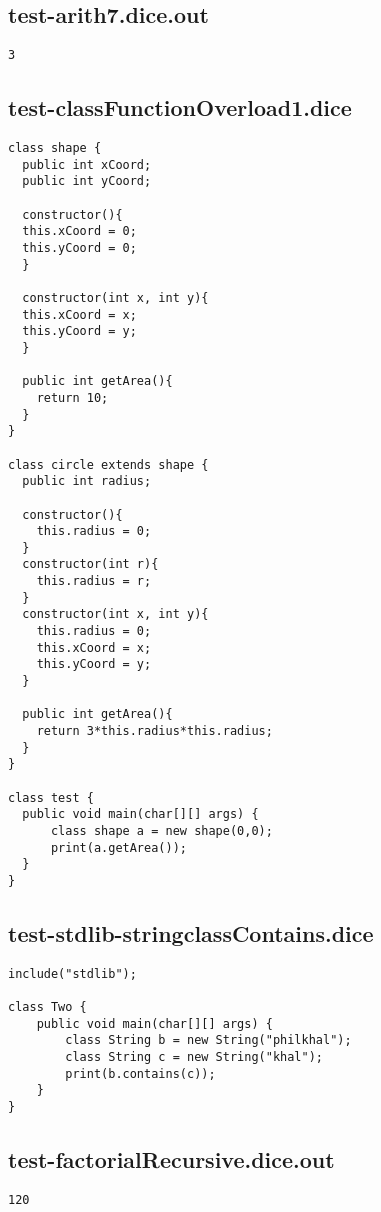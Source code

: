 \subsection{test-arith7.dice.out}
\begin{verbatim}
3
\end{verbatim}
\pagebreak
\subsection{test-classFunctionOverload1.dice}
\begin{verbatim}
class shape {
  public int xCoord;
  public int yCoord;

  constructor(){
  this.xCoord = 0;
  this.yCoord = 0;
  }

  constructor(int x, int y){
  this.xCoord = x;
  this.yCoord = y;
  }

  public int getArea(){
    return 10;
  }
}

class circle extends shape {
  public int radius;

  constructor(){
  	this.radius = 0;
  }
  constructor(int r){
  	this.radius = r;
  }
  constructor(int x, int y){
  	this.radius = 0;
  	this.xCoord = x;
  	this.yCoord = y;
  }

  public int getArea(){
    return 3*this.radius*this.radius;
  }
}

class test {
  public void main(char[][] args) {
      class shape a = new shape(0,0); 
      print(a.getArea());
  }
}
\end{verbatim}
\pagebreak
\subsection{test-stdlib-stringclassContains.dice}
\begin{verbatim}
include("stdlib");

class Two {
	public void main(char[][] args) {
        class String b = new String("philkhal");
        class String c = new String("khal");
        print(b.contains(c));
	}
}

\end{verbatim}
\pagebreak
\subsection{test-factorialRecursive.dice.out}
\begin{verbatim}
120
\end{verbatim}
\pagebreak
